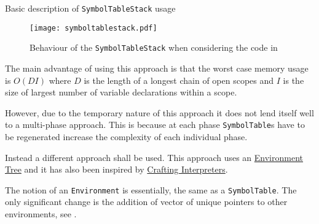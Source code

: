 \begin{algorithm}[H]


\caption{Basic description of \texttt{SymbolTableStack} usage}
\label{alg:basicsymboltablestack}
\end{algorithm}

\begin{figure}[H]
\centering
\begin{mdframed}[backgroundcolor=UMPaleRed]
\texttt{[image: symboltablestack.pdf]}
\end{mdframed}
\caption{Behaviour of the \texttt{SymbolTableStack} when
considering the code in }
\label{fig:graphicaldecpiction}
\end{figure}

The main advantage of using this approach is that the
worst case memory usage is $O(DI)$ where $D$ is the length of a
longest chain of open scopes and $I$ is the size of largest
number of variable declarations within a scope.

However, due to the temporary nature of this approach it does
not lend itself well to a multi-phase approach. This is because
at each phase \texttt{SymbolTable}s have to be regenerated
increase the complexity of each individual phase.

Instead a different approach shall be used. This approach uses
an
\href{https://craftinginterpreters.com/statements-and-state.html#nesting-and-shadowing}{Environment
Tree} and it has also been inspired by
\href{https://craftinginterpreters.com/}{Crafting Interpreters}.

The notion of an \texttt{Environment} is essentially, the same
as a \texttt{SymbolTable}. The only significant change is the
addition of vector of unique pointers to other environments, see
.

